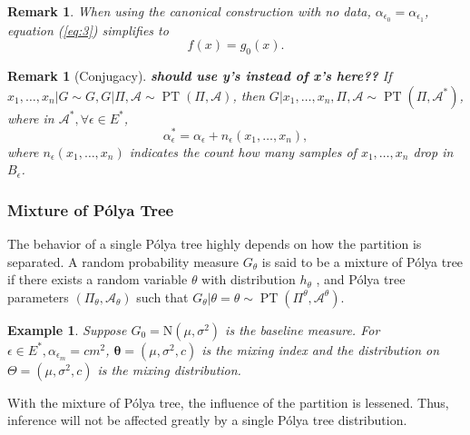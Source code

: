 \documentclass[12pt]{article}
\newtheorem{rmk}[thm]{Remark}
\newtheorem{emp}[thm]{Example}
\newcommand{\polya}{P\'{o}lya}
\DeclareMathOperator{\pt}{PT}
\begin{document}
\begin{rmk}
  When using the canonical construction with no data,
  $\alpha_{\epsilon_0 } = \alpha_{\epsilon_1}$, equation (\ref{eq:3})
  simplifies to 
  \begin{displaymath}
    f(x) = g_0(x).
  \end{displaymath}
\end{rmk}

\begin{rmk}[Conjugacy]
{\bf should use y's instead of x's here??}  If $x_1, \ldots, x_n | G \sim G, G|\Pi, \mathcal{A} \sim \pt (\Pi,
  \mathcal{A})$, then $G|x_1, \ldots, x_n , \Pi, \mathcal{A} \sim \pt
  (\Pi, \mathcal{A}^{*})$, where in $\mathcal{A}^{*}, \forall \epsilon
  \in E^{*}$, 
  \begin{displaymath}
    \alpha_{\epsilon}^{*} = \alpha_{\epsilon} + n_{\epsilon}(x_1, \ldots, x_n),
  \end{displaymath}
  where $n_{\epsilon}(x_1, \ldots, x_n)$ indicates the count how many
  samples of $x_1, \ldots, x_n$ drop in $B_{\epsilon}$. 
\end{rmk}

\subsubsection{Mixture of \polya{} Tree}
The behavior of a single \polya{} tree highly depends on how the
partition is separated. A random probability measure $G_\theta$ is
said to be a mixture of \polya{} tree if there exists a random
variable $\theta$ with distribution $h_{\theta}$ , and \polya{} tree
parameters $(\Pi_{\theta}, \mathcal{A}_{\theta})$ such that
$G_{\theta} | \theta=\theta \sim \pt (\Pi^{\theta},
\mathcal{A}^{\theta})$.

\begin{emp}
  Suppose $G_0 = \mathrm{N}(\mu, \sigma^2)$ is the baseline measure.
  For $\epsilon \in E^{*}, \alpha_{\epsilon_m} = cm^2 $, 
  $\bm{\theta}= (\mu, \sigma^2, c)$ is the mixing index and the
  distribution on $\Theta = (\mu, \sigma^2, c) $ is the mixing
  distribution. 
\end{emp}
With the mixture of \polya{} tree, the influence of the partition
is lessened. Thus, inference will not be affected greatly by a single
\polya{} tree distribution. 
\end{document}
